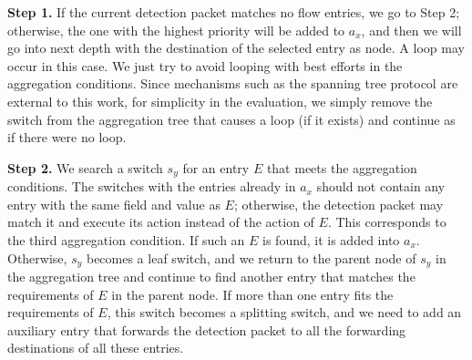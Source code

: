 \documentclass[conference]{IEEEtran}
\begin{document}
%
%      

\textbf{Step 1.} If the current detection packet matches no flow entries, we go to Step 2; otherwise, the one with the highest priority will be added to $a_x$, and then we will go into next depth with the destination of the selected entry as node. A loop may occur in this case. We just try to avoid looping with best efforts in the aggregation conditions. Since mechanisms such as the spanning tree protocol are external to this work, for simplicity in the evaluation, we simply remove the switch from the aggregation tree that causes a loop (if it exists) and continue as if there were no loop.

\textbf{Step 2.}
We search a switch $s_y$ for an entry $E$ that meets the aggregation conditions. The switches with the entries already in $a_x$ should not contain any entry with the same field and value as $E$; otherwise, the detection packet may match it and execute its action instead of the action of $E$. This corresponds to the third aggregation condition. If such an $E$ is found, it is added into $a_x$. Otherwise, $s_y$ becomes a leaf switch, and we return to the parent node of $s_y$ in the aggregation tree and continue to find another entry that matches the requirements of $E$ in the parent node. If more than one entry fits the requirements of $E$, this switch becomes a splitting switch, and we need to add an auxiliary entry that forwards the detection packet to all the forwarding destinations of all these entries.
\end{document}
